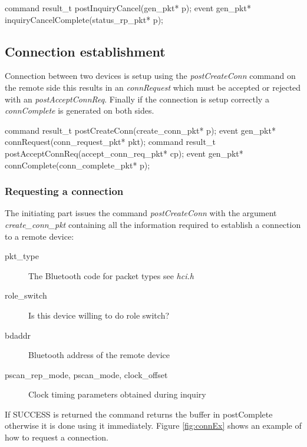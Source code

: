 \documentclass[a4paper,10pt]{article}
\begin{document}
\begin{boxedverbatim}
command result_t postInquiryCancel(gen_pkt* p);
event gen_pkt* inquiryCancelComplete(status_rp_pkt* p);
\end{boxedverbatim}

\subsection{Connection establishment}
Connection between two devices is setup using the
\emph{postCreateConn} command on the remote side this results in an
\emph{connRequest} which must be accepted or rejected with an
\emph{postAcceptConnReq}. Finally if the connection is setup correctly
a \emph{connComplete} is generated on both sides.

\begin{boxedverbatim}
command result_t postCreateConn(create_conn_pkt* p);
event gen_pkt* connRequest(conn_request_pkt* pkt);
command result_t postAcceptConnReq(accept_conn_req_pkt* cp);
event gen_pkt* connComplete(conn_complete_pkt* p);
\end{boxedverbatim}

\subsubsection{Requesting a connection}
The initiating part issues the command \emph{postCreateConn} with the
argument \emph{create\_conn\_pkt} containing all the information
required to establish a connection to a remote device:
\begin{description}
\item[pkt\_type] The Bluetooth code for packet types see \emph{hci.h}

\item[role\_switch] Is this device willing to do role switch?

\item[bdaddr] Bluetooth address of the remote device

\item[pscan\_rep\_mode, pscan\_mode, clock\_offset] Clock timing
  parameters obtained during inquiry
\end{description}

If SUCCESS is returned the command returns the buffer in postComplete
otherwise it is done using it immediately. Figure \ref{fig:connEx}
shows an example of how to request a connection.
\end{document}
